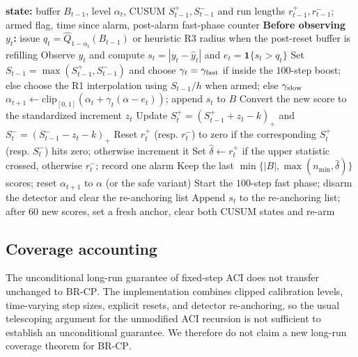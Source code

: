 \documentclass[10pt]{article}
\newcommand{\ind}{\mathbf{1}}
\newcommand{\brcp}{\textsc{BR-CP}}
\begin{document}
\begin{algorithm}[t]
\caption{One causal BR-CP update (main evaluated variant)}
\label{alg:brcp}
\begin{algorithmic}[1]
\STATE \textbf{state:} buffer $B_{t-1}$, level $\alpha_t$, CUSUM
$S^+_{t-1},S^-_{t-1}$ and run lengths $r^+_{t-1},r^-_{t-1}$;
armed flag, time since alarm, post-alarm fast-phase counter
\STATE \textbf{Before observing $y_t$:} issue
$q_t=\widehat Q_{1-\alpha_t}(B_{t-1})$ or heuristic R3 radius
when the post-reset buffer is refilling
\STATE Observe $y_t$ and compute $s_t=|y_t-\hat y_t|$ and
$e_t=\ind\{s_t>q_t\}$
\STATE Set $S_{t-1}=\max(S^+_{t-1},S^-_{t-1})$ and choose
$\gamma_t=\gamma_{\rm fast}$ if inside the $100$-step boost;
else choose the R1 interpolation using $S_{t-1}/h$ when armed;
else $\gamma_{\rm slow}$
\STATE $\alpha_{t+1}\gets\mathrm{clip}_{[0,1]}
(\alpha_t+\gamma_t(\alpha-e_t))$; append $s_t$ to $B$
  \STATE Convert the new score to the standardized increment $z_t$
  \STATE Update $S^+_t=(S^+_{t-1}+z_t-k)_+$ and
$S^-_t=(S^-_{t-1}-z_t-k)_+$
  \STATE Reset $r_t^+$ (resp. $r_t^-$) to zero if the
corresponding $S_t^+$ (resp. $S_t^-$) hits zero; otherwise increment it
     \STATE Set $\widehat\delta\gets r_t^+$ if the upper statistic
crossed, otherwise $r_t^-$; record one alarm
     \STATE Keep the last $\min\{|B|,\max(n_{\min},\widehat\delta)\}$
     scores; reset $\alpha_{t+1}$ to $\alpha$ (or the safe variant)
     \STATE Start the $100$-step fast phase; disarm the detector
     and clear the re-anchoring list
  \ENDIF
\ELSE
  \STATE Append $s_t$ to the re-anchoring list; after $60$ new
scores, set a fresh anchor, clear both CUSUM states and re-arm
\ENDIF
\end{algorithmic}
\end{algorithm}

\subsection{Coverage accounting}

The unconditional long-run guarantee of fixed-step ACI does not transfer unchanged to \brcp{}. The implementation combines clipped calibration levels, time-varying step sizes, explicit resets, and detector re-anchoring, so the usual telescoping argument for the unmodified ACI recursion is not sufficient to establish an unconditional guarantee. We therefore do not claim a new long-run coverage theorem for \brcp{}.
\end{document}
